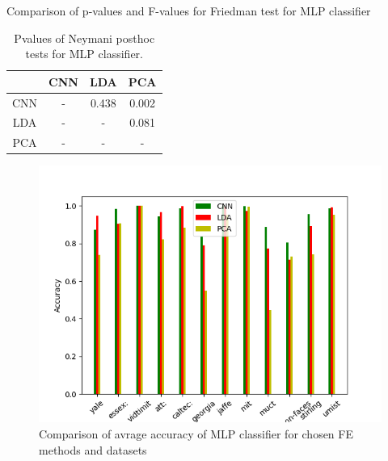 \documentclass[a4paper, 10 pt, conference]{ieeeconf}
\begin{document}
\begin{table}[!h]
    \centering
    \caption{Comparison of p-values and F-values for Friedman test for MLP classifier}
    
    \label{table:NN_pvalues}
\end{table}

\begin{table}[!h]
    \centering
    \caption{Pvalues of Neymani posthoc tests for MLP classifier.}
    \begin{tabular}{|c|c|c|c|}
         \hline
          & CNN & LDA & PCA \\
         \hline
         CNN &  - &  0.438 &  0.002 \\
         \hline
         LDA &  - & - &  0.081 \\
         \hline
         PCA &  - & - & - \\
         \hline
    \end{tabular}
    \label{tab:NN_posthoc_pvalues}
\end{table}

\begin{figure}[!h]
    \centering
    \includegraphics[scale=0.875]{images/NN_accuracy_comparison.png}
    \caption{Comparison of avrage accuracy of MLP classifier for chosen FE methods and datasets}
    \label{fig:NN_acc_comparision}
\end{figure}
\end{document}
